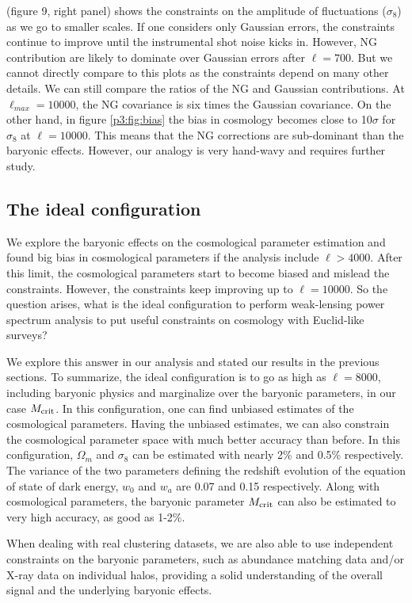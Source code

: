 \documentclass[
  11pt,
  twoside,
  openright,
  titlepage,
  headings=optiontoheadandtoc
]{scrbook}
\begin{document}
\cite{2012PhRvD..86h3504Y} (figure 9, right panel) shows the constraints on the amplitude of fluctuations ($\sigma_8$) as we go to smaller scales. If one considers only Gaussian errors, the constraints continue to improve until the instrumental shot noise kicks in. However, NG contribution are likely to dominate over Gaussian errors after $\ell=700$. But we cannot directly compare to this plots as the constraints depend on many other details. We can still compare the ratios of the NG and Gaussian contributions. At $\ell_{max}=10000$, the NG covariance is six times the Gaussian covariance. On the other hand, in figure \ref{p3:fig:bias} the bias in cosmology becomes close to 10$\sigma$ for $\sigma_8$ at $\ell=10000$. This means that the NG corrections are sub-dominant than the baryonic effects. However, our analogy is very hand-wavy and requires further study.

\subsection{The ideal configuration}

We explore the baryonic effects on the cosmological parameter estimation and found big bias in cosmological parameters if the analysis include $\ell>4000$. After this limit, the cosmological parameters start to become biased and mislead the constraints. However, the constraints keep improving up to $\ell=10000$. So the question arises, what is the ideal configuration to perform weak-lensing power spectrum analysis to put useful constraints on cosmology with Euclid-like surveys? 

We explore this answer in our analysis and stated our results in the previous sections. To summarize, the ideal configuration is to go as high as $\ell=8000$, including baryonic physics and marginalize over the baryonic parameters, in our case $M_{\rm crit}$. In this configuration, one can find unbiased estimates of the cosmological parameters. Having the unbiased estimates, we can also constrain the cosmological parameter space with much better accuracy than before. In this configuration, $\Omega_m$ and $\sigma_8$ can be estimated with nearly 2\% and 0.5\% respectively. The variance of the two parameters defining the redshift evolution of the equation of state of dark energy, $w_0$ and $w_a$ are 0.07 and 0.15 respectively. Along with cosmological parameters, the baryonic parameter $M_{\rm crit}$ can also be estimated to very high accuracy, as good as 1-2\%.

When dealing with real clustering datasets, we are also able to use independent constraints on the baryonic parameters, such as abundance matching data and/or X-ray data on individual halos, providing a solid understanding of the overall signal and the underlying baryonic effects.
\end{document}
